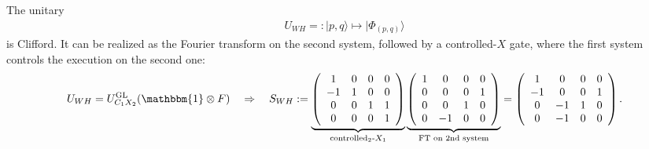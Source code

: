 \documentclass[aps,nofootinbib,floatfix,a4paper]{revtex4}
\newcommand{\1}{\mbox{$\mathbf{1}$}}
\def\Id{\mathbbm{1}}
\DeclareMathOperator{\GL}{GL}
\begin{document}
The unitary 
\begin{align}\label{eqn:uwh}
	U_{WH}=: |p,q\rangle \mapsto |\Phi_{(p,q)}\rangle
\end{align}
is Clifford.
It can be realized as the Fourier transform on the second system, 
followed by a controlled-$X$ gate, where the first system controls the execution on the second one:
\begin{align}\label{eqn:swh}
	U_{WH}
	=
	U^{\GL}_{C_1X_2}
	(\Id\otimes F)
	\quad
	\Rightarrow
	\quad
	S_{WH}
	:=
	\underbrace{
		\left(
			\begin{array}{cccc}
			 1 & 0 & 0 & 0 \\
			 -1 & 1 & 0 & 0 \\
			 0 & 0 & 1 & 1 \\
			 0 & 0 & 0 & 1 \\
			\end{array}
		\right)
	}_{\text{controlled$_2$-$X_1$}}
	\underbrace{
		\left(
			\begin{array}{cccc}
			 1 & 0 & 0 & 0 \\
			 0 & 0 & 0 & 1 \\
			 0 & 0 & 1 & 0 \\
			 0 & -1 & 0 & 0 \\
			\end{array}
		\right)
	}_{\text{FT on 2nd system}}
	=
	 \left(
	 	\begin{array}{cccc}
	 	 1  & 0  & 0 & 0 \\
	 	 -1 & 0  & 0 & 1 \\
	 	 0  & -1 & 1 & 0 \\
	 	 0  & -1 & 0 & 0 \\
	 	\end{array}
	 \right)
	.
\end{align}
\end{document}

